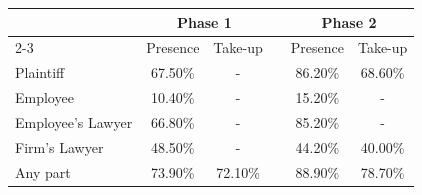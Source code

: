 \begin{tabular}{lccccc}
\toprule
      & \multicolumn{2}{c}{Phase 1} &       & \multicolumn{2}{c}{Phase 2} \\
\cmidrule{2-3}\cmidrule{5-6}      & Presence & Take-up &       & Presence & Take-up \\
\midrule
\midrule
Plaintiff & 67.50\% & -     &       & 86.20\% & 68.60\% \\
Employee  & 10.40\% & -     &       & 15.20\% & - \\
Employee's Lawyer & 66.80\% & -     &       & 85.20\% & - \\
Firm's Lawyer & 48.50\% & -     &       & 44.20\% & 40.00\% \\
Any part & 73.90\% & 72.10\% &       & 88.90\% & 78.70\% \\
\bottomrule
\bottomrule
\end{tabular}%
